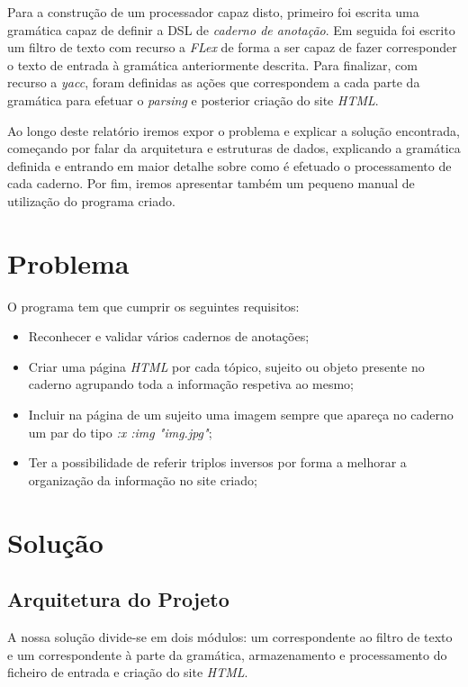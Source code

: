 \documentclass[a4paper]{report}
\begin{document}
Para a construção de um processador capaz disto, primeiro foi escrita uma
gramática capaz de definir a DSL de \textit{caderno de anotação}. Em seguida foi
escrito um filtro de texto com recurso a \textit{FLex} de forma a ser capaz de
fazer corresponder o texto de entrada à gramática anteriormente descrita. Para
finalizar, com recurso a \textit{yacc}, foram definidas as ações que
correspondem a cada parte da gramática para efetuar o \textit{parsing} e
posterior criação do site \textit{HTML}.

Ao longo deste relatório iremos expor o problema e explicar a solução
encontrada, começando por falar da arquitetura e estruturas de dados, explicando
a gramática definida e entrando em maior detalhe sobre como é efetuado o
processamento de cada caderno. Por fim, iremos apresentar também um pequeno
manual de utilização do programa criado.

\chapter{Problema}

O programa tem que cumprir os seguintes requisitos:
\begin{itemize}
    \item Reconhecer e validar vários cadernos de anotações;
    \item Criar uma página \textit{HTML} por cada tópico, sujeito ou objeto
        presente no caderno agrupando toda a informação respetiva ao mesmo;
    \item Incluir na página de um sujeito uma imagem sempre que apareça no
        caderno um par do tipo \textit{:x :img "img.jpg"};
    \item Ter a possibilidade de referir triplos inversos por forma a melhorar
        a organização da informação no site criado;
\end{itemize}

\chapter{Solução}

\section{Arquitetura do Projeto}

A nossa solução divide-se em dois módulos: um correspondente ao filtro de texto
e um correspondente à parte da gramática, armazenamento e processamento do
ficheiro de entrada e criação do site \textit{HTML}.
\end{document}
